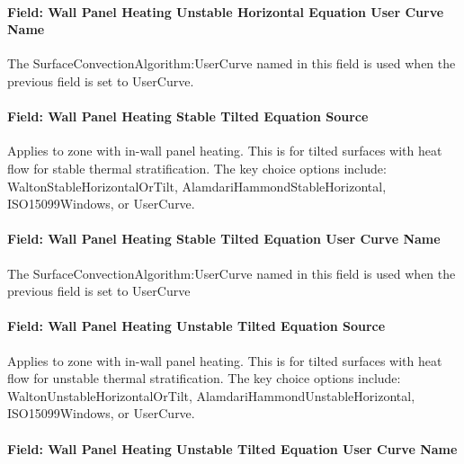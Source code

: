 \paragraph{Field: Wall Panel Heating Unstable Horizontal Equation User Curve Name}\label{field-wall-panel-heating-unstable-horizontal-equation-user-curve-name}

The SurfaceConvectionAlgorithm:UserCurve named in this field is used when the previous field is set to UserCurve.

\paragraph{Field: Wall Panel Heating Stable Tilted Equation Source}\label{field-wall-panel-heating-stable-tilted-equation-source}

Applies to zone with in-wall panel heating. This is for tilted surfaces with heat flow for stable thermal stratification. The key choice options include: WaltonStableHorizontalOrTilt, AlamdariHammondStableHorizontal, ISO15099Windows, or UserCurve.

\paragraph{Field: Wall Panel Heating Stable Tilted Equation User Curve Name}\label{field-wall-panel-heating-stable-tilted-equation-user-curve-name}

The SurfaceConvectionAlgorithm:UserCurve named in this field is used when the previous field is set to UserCurve

\paragraph{Field: Wall Panel Heating Unstable Tilted Equation Source}\label{field-wall-panel-heating-unstable-tilted-equation-source}

Applies to zone with in-wall panel heating. This is for tilted surfaces with heat flow for unstable thermal stratification. The key choice options include: WaltonUnstableHorizontalOrTilt, AlamdariHammondUnstableHorizontal, ISO15099Windows, or UserCurve.

\paragraph{Field: Wall Panel Heating Unstable Tilted Equation User Curve Name}\label{field-wall-panel-heating-unstable-tilted-equation-user-curve-name}

